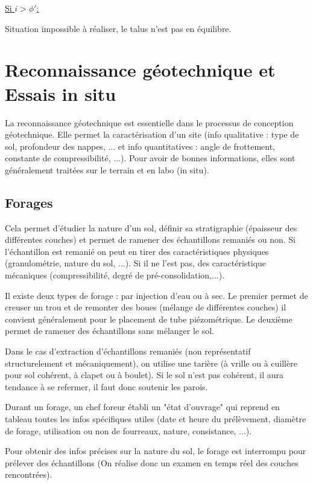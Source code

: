              \underline{Si $i > \phi'$:} 
            
            Situation impossible à réaliser, le talus n'est pas en équilibre.
            
\section{Reconnaissance géotechnique et Essais in situ}
    
    La reconnaissance géotechnique est essentielle dans le processus de conception géotechnique. Elle permet la caractérisation d'un site (info qualitative : type de sol, profondeur des nappes, ... et info quantitatives : angle de frottement, constante de compressibilité, ...). Pour avoir de bonnes informations, elles sont généralement traitées sur le terrain et en labo (in situ).
        
    \subsection{Forages}
        
        Cela permet d'étudier la nature d'un sol, définir sa stratigraphie (épaisseur des différentes couches) et permet de ramener des échantillons remaniés ou non. Si l'échantillon est remanié on peut en tirer des caractéristiques physiques (granulométrie, nature du sol, ...). Si il ne l'est pas, des caractéristique mécaniques (compressibilité, degré de pré-consolidation,...). 
            
        Il existe deux types de forage : par injection d'eau ou à sec. Le premier permet de creuser un trou et de remonter des boues (mélange de différentes couches) il convient généralement pour le placement de tube piézométrique. Le deuxième permet de ramener des échantillons sans mélanger le sol. 
            
        Dans le cas d'extraction d'échantillons remaniés (non représentatif structurelement et mécaniquement), on utilise une tarière (à vrille ou à cuillère pour sol cohérent, à clapet ou à boulet). Si le sol n'est pas cohérent, il aura tendance à se refermer, il faut donc soutenir les parois.
            
        Durant un forage, un chef foreur établi un "état d'ouvrage" qui reprend en tableau toutes les infos spécifiques utiles (date et heure du prélèvement, diamètre de forage, utilisation ou non de fourreaux, nature, consistance, ...). 
            
        Pour obtenir des infos précises sur la nature du sol, le forage est interrompu pour prélever des échantillons (On réalise donc un examen en temps réel des couches rencontrées). 
            
